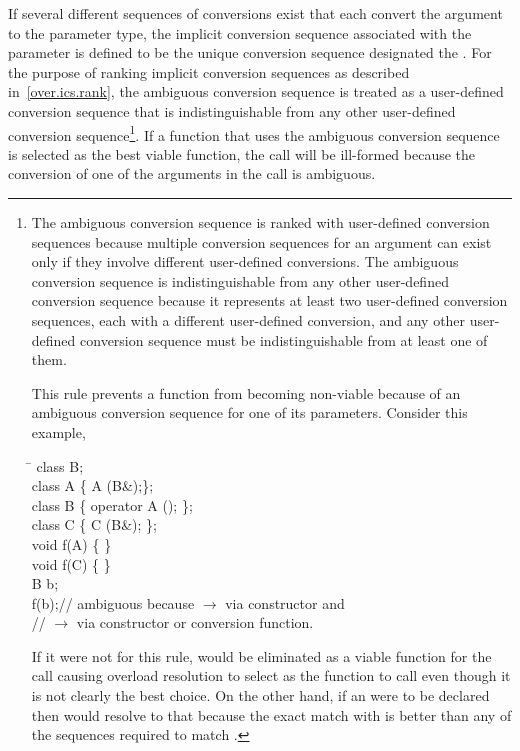 \pnum
If several different sequences of conversions exist that each
convert the argument to the parameter type, the implicit
conversion sequence associated with the parameter is defined to be
the unique conversion sequence designated the
.
%
For the purpose of ranking implicit conversion sequences as described
in~\ref{over.ics.rank}, the ambiguous conversion sequence is treated
as a user-defined conversion sequence that is indistinguishable from any
other user-defined conversion sequence\footnote{The ambiguous conversion
sequence is ranked with user-defined
conversion sequences because multiple conversion sequences
for an argument can exist only if they involve different
user-defined conversions.  The ambiguous conversion sequence
is indistinguishable from any other user-defined conversion
sequence because it represents at least two user-defined conversion
sequences, each with a different user-defined conversion, and
any other user-defined conversion sequence must be
indistinguishable from at least one of them.

This rule prevents a function from becoming non-viable because of an ambiguous
conversion sequence for one of its parameters.
Consider this example,

\begin{ttfamily}
\begin{tabbing}
\hspace{2in}\=\kill%
\indent class B;\\
\indent class A \{ A (B\&);\};\\
\indent class B \{ operator A (); \};\\
\indent class C \{ C (B\&); \};\\
\indent void f(A) \{ \}\\
\indent void f(C) \{ \}\\
\indent B b;\\
\indent f(b);\>\textrm{// ambiguous because  $\to$  via constructor and}\\
\indent \>\textrm{//  $\to$  via constructor or conversion function.}
\end{tabbing}
\end{ttfamily}

If it were not for this rule,
would be eliminated as a viable
function for the call
causing overload resolution to select
as the function to call even though it is not clearly the best
choice.
On the other hand, if an
were to be declared then
would resolve to that
because the exact match
with
is better than any of the sequences required to match
.}.
If a function that uses the ambiguous conversion sequence is selected
as the best viable function, the call will be ill-formed because the conversion
of one of the arguments in the call is ambiguous.

